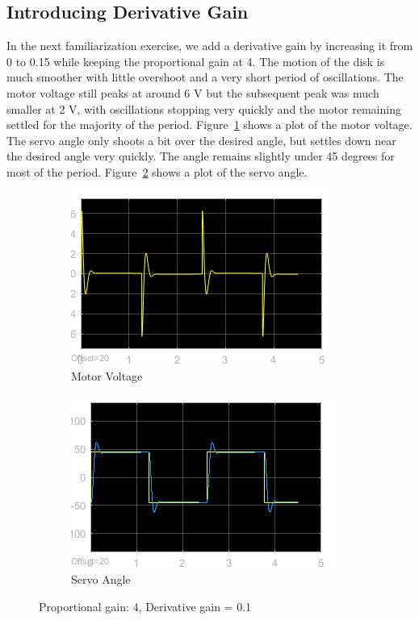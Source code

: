 \documentclass[12pt]{article}
\begin{document}
\subsection*{Introducing Derivative Gain} %
In the next familiarization exercise, we add a derivative gain by increasing it from 0 to 0.15 while keeping the proportional gain at 4. The motion of the disk is much smoother with little overshoot and a very short period of oscillations. The motor voltage still peaks at around 6 V but the subsequent peak was much smaller at 2 V, with oscillations stopping very quickly and the motor remaining settled for the majority of the period. Figure~\ref{fig:xi_volt} shows a plot of the motor voltage. The servo angle only shoots a bit over the desired angle, but settles down near the desired angle very quickly. The angle remains slightly under 45 degrees for most of the period. Figure~\ref{fig:xi_angle} shows a plot of the servo angle.
\begin{figure}[h!]
    \centering
    \begin{subfigure}[b]{0.49\textwidth}
        \includegraphics[width=\textwidth]{xi_voltage}
        \caption{\label{fig:xi_volt}Motor Voltage}
    \end{subfigure}
    \begin{subfigure}[b]{0.49\textwidth}
        \includegraphics[width=\textwidth]{xi_angle}
        \caption{\label{fig:xi_angle}Servo Angle}    
    \end{subfigure}
    \caption{\label{fig:xi} Proportional gain: 4, Derivative gain = 0.1}
\end{figure}
\end{document}
